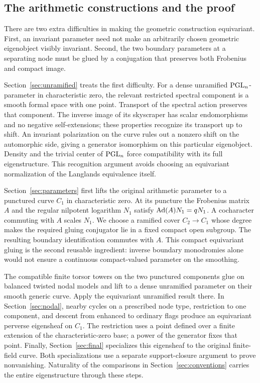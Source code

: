 \subsection{The arithmetic constructions and the proof}

There are two extra difficulties in making the geometric construction
equivariant. First, an invariant parameter need not make an arbitrarily
chosen geometric eigenobject visibly invariant. Second, the two boundary
parameters at a separating node must be glued by a conjugation that
preserves both Frobenius and compact image.

Section~\ref{sec:unramified} treats the first difficulty. For a dense
unramified $\mathrm{PGL}_n$-parameter in characteristic zero, the relevant
restricted spectral component is a smooth formal space with one point.
Transport of the spectral action preserves that component. The inverse
image of its skyscraper has scalar endomorphisms and no negative
self-extensions; these properties recognize its transport up to shift.
An invariant polarization on the curve rules out a nonzero shift on the
automorphic side, giving a generator isomorphism on this particular
eigenobject. Density and the
trivial center of $\mathrm{PGL}_n$ force compatibility with its full eigenstructure.
This recognition argument avoids choosing an equivariant normalization
of the Langlands equivalence itself.

Section~\ref{sec:parameters} first lifts the original arithmetic parameter
to a punctured curve $C_1$ in characteristic zero. At its puncture the
Frobenius matrix $A$ and the regular nilpotent logarithm $N_1$ satisfy
$\operatorname{Ad}(A)N_1=qN_1$. A cocharacter commuting with $A$ scales $N_1$.
We choose a ramified cover $C_2\to C_1$ whose degree makes the required
gluing conjugator lie in a fixed compact open subgroup. The resulting
boundary identification commutes with $A$. This compact equivariant gluing
is the second reusable ingredient: inverse boundary monodromies alone
would not ensure a continuous compact-valued parameter on the smoothing.

The compatible finite torsor towers on the two punctured components glue
on balanced twisted nodal models and lift to a dense unramified parameter
on their smooth generic curve. Apply the equivariant unramified result
there. In Section~\ref{sec:nodal}, nearby cycles on a prescribed node type,
restriction to one component, and descent from enhanced to ordinary flags
produce an equivariant perverse eigensheaf on $C_1$. The restriction uses
a point defined over a finite extension of the characteristic-zero base;
a power of the generator fixes that point. Finally,
Section~\ref{sec:final} specializes this eigensheaf to the original
finite-field curve. Both specializations use a separate support-closure
argument to prove nonvanishing. Naturality of the comparisons in
Section~\ref{sec:conventions} carries the entire eigenstructure through
these steps.
